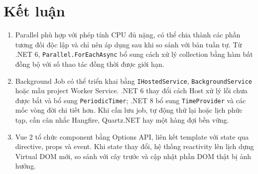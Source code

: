 \Needspace{0.14\textheight}
\section{Kết luận}

\begin{enumerate}
  \item Parallel phù hợp với phép tính CPU đủ nặng, có thể chia thành các phần tương
  đối độc lập và chỉ nên áp dụng sau khi so sánh với bản tuần tự. Từ .NET 6,
  \texttt{Parallel.ForEachAsync} bổ sung cách xử lý collection bằng hàm bất đồng bộ
  với số thao tác đồng thời được giới hạn.

  \item Background Job có thể triển khai bằng \texttt{IHostedService},
  \texttt{BackgroundService} hoặc mẫu project Worker Service. .NET 6 thay đổi cách
  Host xử lý lỗi chưa được bắt và bổ sung \texttt{PeriodicTimer}; .NET 8 bổ sung
  \texttt{TimeProvider} và các mốc vòng đời chi tiết hơn. Khi cần lưu job, tự động thử lại hoặc
  lịch phức tạp, cần cân nhắc Hangfire, Quartz.NET hay một hàng đợi bền vững.

  \item Vue 2 tổ chức component bằng Options API, liên kết template với state qua
  directive, props và event. Khi state thay đổi, hệ thống reactivity lên lịch dựng
  Virtual DOM mới, so sánh với cây trước và cập nhật phần DOM thật bị ảnh hưởng.
\end{enumerate}
